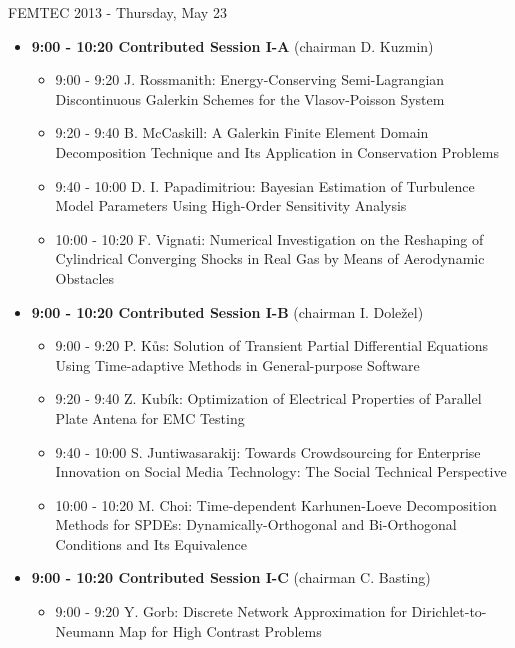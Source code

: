 \documentclass[10pt]{article}%
\begin{document}
\newpage
\newpage

\centerline{\huge FEMTEC 2013 - Thursday, May 23}
\vspace{4mm}

\begin{itemize}    
\item {\bf 9:00 - 10:20 Contributed Session I-A} (chairman D. Kuzmin) 
  \begin{itemize}
    \item 9:00 - 9:20 {J. Rossmanith}: {Energy-Conserving Semi-Lagrangian Discontinuous Galerkin Schemes for the Vlasov-Poisson System} %
    \item 9:20 - 9:40 {B. McCaskill}: {A Galerkin Finite Element Domain Decomposition Technique and Its Application in Conservation Problems}
    \item 9:40 - 10:00 {D. I. Papadimitriou}: {Bayesian Estimation of Turbulence Model Parameters Using High-Order Sensitivity Analysis}
    \item 10:00 - 10:20 {F. Vignati}: {Numerical Investigation on the Reshaping of Cylindrical Converging Shocks in Real Gas by Means of Aerodynamic Obstacles}
  \end{itemize}
  \item {\bf 9:00 - 10:20 Contributed Session I-B} (chairman I. Doležel) 
  \begin{itemize}
    \item 9:00 - 9:20 {P. Kůs}: {Solution of Transient Partial Differential Equations Using Time-adaptive Methods in General-purpose Software}
    \item 9:20 - 9:40 {Z. Kubík}: {Optimization of Electrical Properties of Parallel Plate Antena for EMC Testing}
    \item 9:40 - 10:00 {S. Juntiwasarakij}: {Towards Crowdsourcing for Enterprise Innovation on Social Media Technology: The Social Technical Perspective} %
    \item 10:00 - 10:20 {M. Choi}: {Time-dependent Karhunen-Loeve Decomposition Methods for SPDEs: Dynamically-Orthogonal and Bi-Orthogonal Conditions and Its Equivalence}
  \end{itemize}
    \item {\bf 9:00 - 10:20 Contributed Session I-C} (chairman C. Basting) 
  \begin{itemize}
    \item 9:00 - 9:20 {Y. Gorb}: {Discrete Network Approximation for Dirichlet-to-Neumann Map for High Contrast Problems} %

\end{itemize}
\end{itemize}
\end{document}
